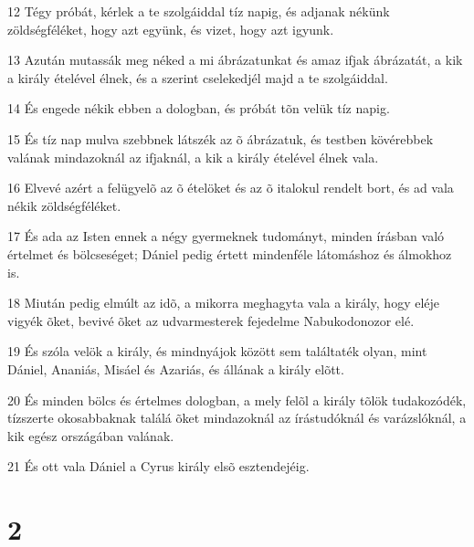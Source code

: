\par 12 Tégy próbát, kérlek a te szolgáiddal tíz napig, és adjanak nékünk zöldségféléket, hogy azt együnk, és vizet, hogy azt igyunk.
\par 13 Azután mutassák meg néked a mi ábrázatunkat és amaz ifjak ábrázatát, a kik a király ételével élnek, és a szerint cselekedjél majd a te szolgáiddal.
\par 14 És engede nékik ebben a dologban, és próbát tõn velük tíz napig.
\par 15 És tíz nap mulva szebbnek látszék az õ ábrázatuk, és testben kövérebbek valának mindazoknál az ifjaknál, a kik a király ételével élnek vala.
\par 16 Elvevé azért a felügyelõ az õ ételöket és az õ italokul rendelt bort, és ad vala nékik zöldségféléket.
\par 17 És ada az Isten ennek a négy gyermeknek tudományt, minden írásban való értelmet és bölcseséget; Dániel pedig értett mindenféle látomáshoz és álmokhoz is.
\par 18 Miután pedig elmúlt az idõ, a mikorra meghagyta vala a király, hogy eléje vigyék õket, bevivé õket az udvarmesterek fejedelme Nabukodonozor elé.
\par 19 És szóla velök a király, és mindnyájok között sem találtaték olyan, mint Dániel, Ananiás, Misáel és Azariás, és állának a király elõtt.
\par 20 És minden bölcs és értelmes dologban, a mely felõl a király tõlök tudakozódék, tízszerte okosabbaknak találá õket mindazoknál az írástudóknál és varázslóknál, a kik egész országában valának.
\par 21 És ott vala Dániel a Cyrus király elsõ esztendejéig.

\chapter{2}

